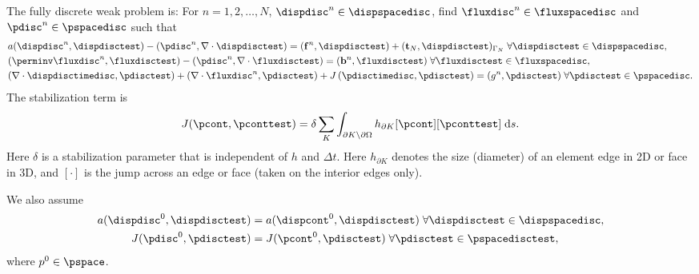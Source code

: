 The fully discrete weak problem is: For $n = 1,2, \ldots,N$, $\dispdisc^{n} \in \dispspacedisc$, find $\fluxdisc^{n} \in \fluxspacedisc$ and $\pdisc^{n} \in \pspacedisc $ such that
\begin{subequations}
\begin{align}
&a(\dispdisc^{n},\dispdisctest)-(\pdisc^{n},\nabla \cdot \dispdisctest) =(\mathbf{f}^{n},\dispdisctest)+(\mathbf{t}_{N},\dispdisctest)_{\Gamma_{N}}
\; \forall \dispdisctest\in \dispspacedisc,
\label{eqn:weak_fulldisc_elast_mom} \\
&(\perminv \fluxdisc^{n},\fluxdisctest)-(\pdisc^{n},\nabla \cdot \fluxdisctest)
= (\mathbf{b}^{n},\fluxdisctest)
\; \forall \fluxdisctest\in \fluxspacedisc,
\label{eqn:weak_fulldisc_flux_mom} \\
&(\nabla \cdot \dispdisctimedisc,\pdisctest)+(\nabla \cdot \fluxdisc^{n},\pdisctest) + J\left(\pdisctimedisc,\pdisctest\right)
=(g^{n},\pdisctest)  \; \forall \pdisctest\in \pspacedisc.
\label{eqn:weak_fulldisc_mass}
\end{align}
\label{eqns:weak_fulldisc_system}
\end{subequations}
The stabilization term is
\begin{equation}
J(\pcont,\pconttest)= \delta \sum_{K} \int_{\partial K \backslash \partial \Omega} h_{\partial K} [\pcont][\pconttest] \;\mbox{d}s.
\end{equation}
Here $\delta$ is a stabilization parameter that is independent of $h$ and $\Delta t $.  Here $ h_{\partial K} $ denotes the size (diameter) of an element edge in 2D or face in 3D, and $[\cdot]$ is the jump across an edge or face (taken on the interior edges only). %

We also assume
\begin{subequations}
\begin{align}
a(\dispdisc^{0},\dispdisctest)
&= a(\dispcont^{0},\dispdisctest)\; \forall \dispdisctest\in \dispspacedisc,
\label{eqn:a_initial} \\
J(\pdisc^{0},\pdisctest) &= J(\pcont^{0},\pdisctest)\; \forall \pdisctest\in \pspacedisctest,
\label{eqn:p_initial}
\end{align}
\label{eqns:weak_disc_initial}
\end{subequations}
where $p^{0} \in \pspace$.


 